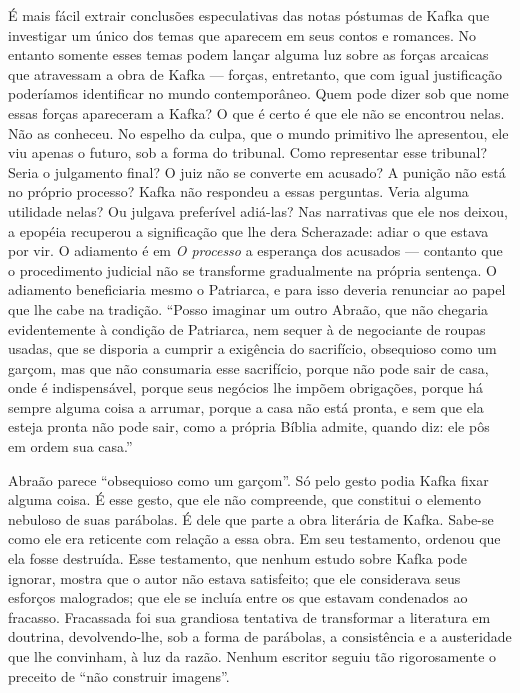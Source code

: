 É mais fácil extrair conclusões especulativas das notas póstumas de
Kafka que investigar um único dos temas que aparecem em seus contos e
romances. No entanto somente esses temas podem lançar alguma luz sobre
as forças arcaicas que atravessam a obra de Kafka --- forças,
entretanto, que com igual justificação poderíamos identificar no mundo
contemporâneo. Quem pode dizer sob que nome essas forças apareceram a
Kafka? O que é certo é que ele não se encontrou nelas. Não as conheceu.
No espelho da culpa, que o mundo primitivo lhe apresentou, ele viu
apenas o futuro, sob a forma do tribunal. Como representar esse
tribunal? Seria o julgamento final? O juiz não se converte em acusado? A
punição não está no próprio processo? Kafka não respondeu a essas
perguntas. Veria alguma utilidade nelas? Ou julgava preferível adiá-las?
Nas narrativas que ele nos deixou, a epopéia recuperou a significação
que lhe dera Scherazade: adiar o que estava por vir. O adiamento é em \textit{O
processo} a esperança dos acusados --- contanto que o procedimento
judicial não se transforme gradualmente na própria sentença. O adiamento
beneficiaria mesmo o Patriarca, e para isso deveria renunciar ao papel
que lhe cabe na tradição. ``Posso imaginar um outro Abraão, que não
chegaria evidentemente à condição de Patriarca, nem sequer à de
negociante de roupas usadas, que se disporia a cumprir a exigência do
sacrifício, obsequioso como um garçom, mas que não consumaria esse
sacrifício, porque não pode sair de casa, onde é indispensável, porque
seus negócios lhe impõem obrigações, porque há sempre alguma coisa a
arrumar, porque a casa não está pronta, e sem que ela esteja pronta não
pode sair, como a própria Bíblia admite, quando diz: ele pôs em ordem
sua casa.''

Abraão parece ``obsequioso como um garçom''. Só pelo gesto podia Kafka
fixar alguma coisa. É esse gesto, que ele não compreende, que constitui
o elemento nebuloso de suas parábolas. É dele que parte a obra literária
de Kafka. Sabe-se como ele era reticente com relação a essa obra. Em seu
testamento, ordenou que ela fosse destruída. Esse testamento, que nenhum
estudo sobre Kafka pode ignorar, mostra que o autor não estava
satisfeito; que ele considerava seus esforços malogrados; que ele se
incluía entre os que estavam condenados ao fracasso. Fracassada foi sua
grandiosa tentativa de transformar a literatura em doutrina,
devolvendo-lhe, sob a forma de parábolas, a consistência e a austeridade
que lhe convinham, à luz da razão. Nenhum escritor seguiu tão
rigorosamente o preceito de ``não construir imagens''.

